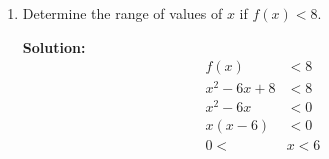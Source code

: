 \documentclass{report}
\newcommand{\sol}{\textbf{Solution:}}
\begin{document}
\begin{enumerate}[leftmargin=*]
\begin{enumerate}
\begin{enumerate}
                              \sol{}
                              \begin{align*}
                                  f(x) & = x^2 + m x + 8                                              \\
                                       & = \left(x^2 + m x + \frac{m^2}{4}\right) - \frac{m^2}{4} + 8 \\
                                       & = \left(x+\frac{m}{2}\right)^2 - \frac{m^2}{4} + 8           \\
                                       & = \left(x+\frac{m}{2}\right)^2 - \frac{m^2-32}{4}
                              \end{align*}
                              The minimum point is $\left(-\dfrac{m}{2}, \dfrac{m^2-32}{4}\right) = (3, h)$.
                              \begin{align*}
                                  -\frac{m}{2} & = 3  \\
                                  m            & = -6
                              \end{align*}
                              \begin{align*}
                                  h & = \frac{m^2-32}{4}    \\
                                    & = \frac{(-6)^2-32}{4} \\
                                    & = \frac{36-32}{4}     \\
                                    & = 1
                              \end{align*}
                              Therefore, $m=-6$ and $h=1$.

                        \item Determine the range of values of $x$ if $f(x)<8$.

                              \sol{}
                              \begin{align*}
                                  f(x)     & < 8   \\
                                  x^2-6x+8 & < 8   \\
                                  x^2-6x   & < 0   \\
                                  x(x-6)   & < 0   \\
                                  0 <      & x < 6
                              \end{align*}
                    \end{enumerate}
          \end{enumerate}


\end{enumerate}
\end{document}
